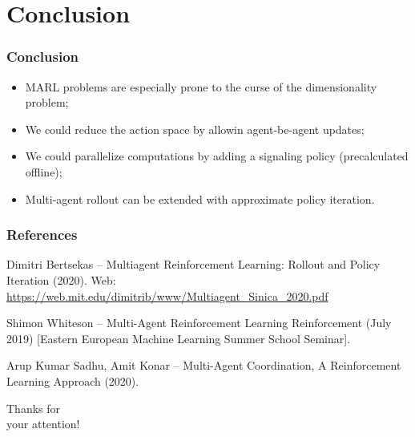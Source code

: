 \documentclass{beamer}
\begin{document}


    \section{Conclusion}

    \begin{frame}
        \frametitle{Conclusion}
        \begin{itemize}
            \item MARL problems are especially prone to the
            curse of the dimensionality problem;

            \item We could reduce the action space
            by allowin agent-be-agent updates;

            \item We could parallelize computations
            by adding a signaling policy (precalculated offline);

            \item Multi-agent rollout can be extended with
            approximate policy iteration.


        \end{itemize}
    \end{frame}


    \begin{frame}
        \frametitle{References}
        \footnotesize{
            \begin{thebibliography}{10}

                \label{bert20}
                Dimitri Bertsekas -- Multiagent Reinforcement Learning: Rollout and Policy Iteration (2020). Web:
                \url{https://web.mit.edu/dimitrib/www/Multiagent_Sinica_2020.pdf}

                \label{whiteson20}
                Shimon Whiteson -- Multi-Agent Reinforcement Learning Reinforcement (July 2019) [Eastern European Machine Learning Summer School Seminar].


                \label{sadhu20}
                Arup Kumar Sadhu, Amit Konar --
                Multi-Agent Coordination,
                A Reinforcement Learning Approach (2020).


            \end{thebibliography}
        }
    \end{frame}


    \begin{frame}

        \begin{center}
            \Huge Thanks for
            \\
            your attention!
        \end{center}

    \end{frame}

\end{document}

